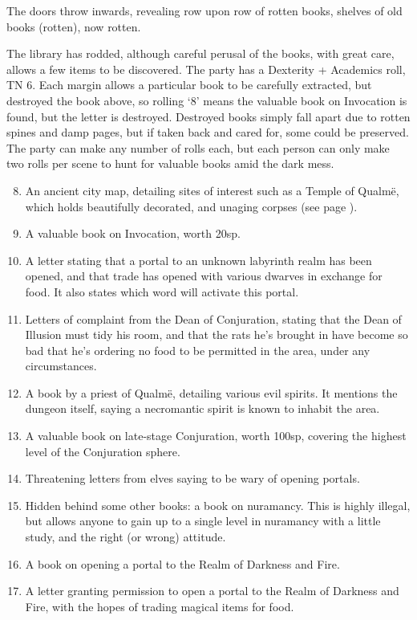 \begin{multicols}{2}
\begin{boxtext}
	The doors throw inwards, revealing row upon row of rotten books, shelves of old books (rotten), now rotten.
\end{boxtext}

The library has rodded, although careful perusal of the books, with great care, allows a few items to be discovered.
The party has a Dexterity + Academics roll, TN 6.
Each margin allows a particular book to be carefully extracted, but destroyed the book above, so rolling `8' means the valuable book on Invocation is found, but the letter is destroyed.
Destroyed books simply fall apart due to rotten spines and damp pages, but if taken back and cared for, some could be preserved.
The party can make any number of rolls each, but each person can only make two rolls per scene to hunt for valuable books amid the dark mess.

\begin{enumerate}

\setcounter{enumi}{7}
	\item{An ancient city map, detailing sites of interest such as a Temple of Qualm\"{e}, which holds beautifully decorated, and unaging corpses (see page \pageref{green_tower})}.
	\item{A valuable book on Invocation, worth 20sp.}
	\item{A letter stating that a portal to an unknown labyrinth realm has been opened, and that trade has opened with various dwarves in exchange for food.  It also states which word will activate this portal.}
	\item{Letters of complaint from the Dean of Conjuration, stating that the Dean of Illusion must tidy his room, and that the rats he's brought in have become so bad that he's ordering no food to be permitted in the area, under any circumstances.}
	\item{A book by a priest of Qualm\"{e}, detailing various evil spirits.  It mentions the dungeon itself, saying a necromantic spirit is known to inhabit the area.}
	\item{A valuable book on late-stage Conjuration, worth 100sp, covering the highest level of the Conjuration sphere.}
	\item{Threatening letters from elves saying to be wary of opening portals.}
	\item{Hidden behind some other books: a book on nuramancy.  This is highly illegal, but allows anyone to gain up to a single level in nuramancy with a little study, and the right (or wrong) attitude.}
	\item{A book on opening a portal to the Realm of Darkness and Fire.}
	\item{A letter granting permission to open a portal to the Realm of Darkness and Fire, with the hopes of trading magical items for food.}


\end{enumerate}
\end{multicols}
